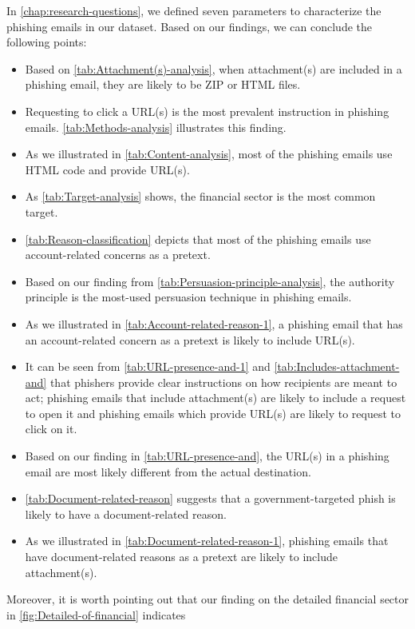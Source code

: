 In \autoref{chap:research-questions}, we defined seven parameters
to characterize the phishing emails in our dataset. Based on our findings,
we can conclude the following points:
\begin{itemize}
\item Based on \autoref{tab:Attachment(s)-analysis}, when attachment(s)
are included in a phishing email, they are likely to be ZIP or HTML
files.
\item Requesting to click a URL(s) is the most prevalent instruction in
phishing emails. \autoref{tab:Methods-analysis} illustrates this
finding.
\item As we illustrated in \autoref{tab:Content-analysis}, most of the
phishing emails use HTML code and provide URL(s). 
\item As \autoref{tab:Target-analysis} shows, the financial sector is the
most common target.
\item \autoref{tab:Reason-classification} depicts that most of the phishing
emails use account-related concerns as a pretext.
\item Based on our finding from \autoref{tab:Persuasion-principle-analysis},
the authority principle is the most-used persuasion technique in phishing
emails.
\item As we illustrated in \autoref{tab:Account-related-reason-1}, a phishing
email that has an account-related concern as a pretext is likely to
include URL(s).
\item It can be seen from \autoref{tab:URL-presence-and-1} and \autoref{tab:Includes-attachment-and}
that phishers provide clear instructions on how recipients are meant
to act; phishing emails that include attachment(s) are likely to include
a request to open it and phishing emails which provide URL(s) are
likely to request to click on it. 
\item Based on our finding in \autoref{tab:URL-presence-and}, the URL(s)
in a phishing email are most likely different from the actual destination.
\item \autoref{tab:Document-related-reason} suggests that a government-targeted
phish is likely to have a document-related reason.
\item As we illustrated in \autoref{tab:Document-related-reason-1}, phishing
emails that have document-related reasons as a pretext are likely
to include attachment(s).
\end{itemize}
Moreover, it is worth pointing out that our finding on the detailed
financial sector in \autoref{fig:Detailed-of-financial} indicates
